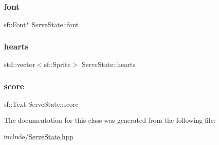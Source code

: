 \subsubsection{\texorpdfstring{font}{font}}
{\footnotesize\ttfamily sf\+::\+Font$\ast$ Serve\+State\+::font\hspace{0.3cm}{\ttfamily [private]}}

\mbox{\label{class_serve_state_aa3ee7e1197bb8e6eab60c04bf8454092}} 
\subsubsection{\texorpdfstring{hearts}{hearts}}
{\footnotesize\ttfamily std\+::vector$<$sf\+::\+Sprite$>$ Serve\+State\+::hearts\hspace{0.3cm}{\ttfamily [private]}}

\mbox{\label{class_serve_state_a914184b17c9c3b7cc3c6b584173cefde}} 
\subsubsection{\texorpdfstring{score}{score}}
{\footnotesize\ttfamily sf\+::\+Text Serve\+State\+::score\hspace{0.3cm}{\ttfamily [private]}}



The documentation for this class was generated from the following file\+:\begin{DoxyCompactItemize}
\item 
include/\mbox{\hyperlink{_serve_state_8hpp}{Serve\+State.\+hpp}}\end{DoxyCompactItemize}
